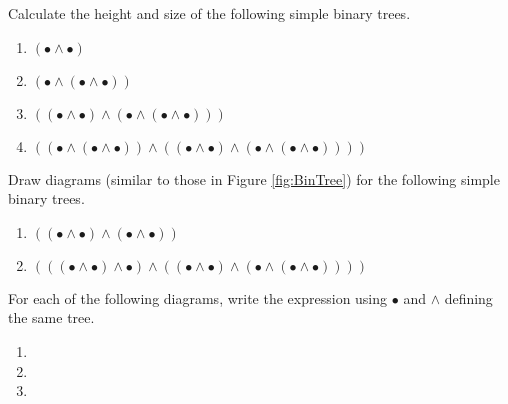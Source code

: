 {\begin{exercises}
  \item Calculate the height and size of the following simple binary trees.
    \begin{enumerate}
    \item $(\bullet\wedge\bullet)$
    \item $(\bullet\wedge (\bullet\wedge\bullet))$
    \item $((\bullet\wedge\bullet)\wedge(\bullet\wedge(\bullet\wedge\bullet)))$
    \item $((\bullet\wedge(\bullet\wedge\bullet))\wedge ((\bullet\wedge\bullet)\wedge(\bullet\wedge(\bullet\wedge\bullet))))$
    \end{enumerate}
   \item Draw diagrams (similar to those in Figure \ref{fig:BinTree}) for the following
   simple binary trees.
   \begin{enumerate}
   \item $((\bullet \wedge \bullet)\wedge(\bullet\wedge\bullet))$
   \item $(((\bullet\wedge\bullet)\wedge\bullet)\wedge ((\bullet\wedge\bullet)\wedge(\bullet\wedge(\bullet\wedge\bullet))))$
   \end{enumerate}
   \item For each of the following diagrams, write the expression using $\bullet$ and $\wedge$
    defining the same tree.
\begin{multicols}{2}
    \begin{enumerate}
    \item 
{}

 \item 


\item



\end{enumerate}
\end{multicols}
\end{exercises}}
